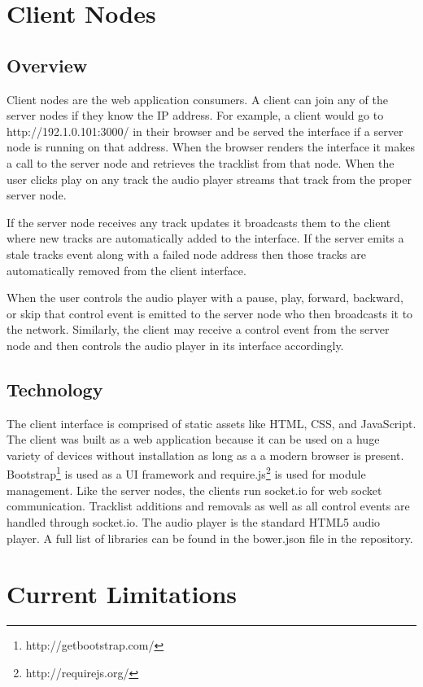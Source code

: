 \documentclass[12pt]{article}
\begin{document}
\section{Client Nodes}

\subsection{Overview}
Client nodes are the web application consumers. A client can join any of the server nodes if they know the IP address. For example, a client would go to http://192.1.0.101:3000/ in their browser and be served the interface if a server node is running on that address. When the browser renders the interface it makes a call to the server node and retrieves the tracklist from that node. When the user clicks play on any track the audio player streams that track from the proper server node.

If the server node receives any track updates it broadcasts them to the client where new tracks are automatically added to the interface. If the server emits a stale tracks event along with a failed node address then those tracks are automatically removed from the client interface.

When the user controls the audio player with a pause, play, forward, backward, or skip that control event is emitted to the server node who then broadcasts it to the network. Similarly, the client may receive a control event from the server node and then controls the audio player in its interface accordingly.

\subsection{Technology}
The client interface is comprised of static assets like HTML, CSS, and JavaScript. The client was built as a web application because it can be used on a huge variety of devices without installation as long as a a modern browser is present. Bootstrap\footnote{http://getbootstrap.com/} is used as a UI framework and require.js\footnote{http://requirejs.org/} is used for module management. Like the server nodes, the clients run socket.io for web socket communication. Tracklist additions and removals as well as all control events are handled through socket.io. The audio player is the standard HTML5 audio player. A full list of libraries can be found in the bower.json file in the repository.

\section{Current Limitations}
\end{document}
